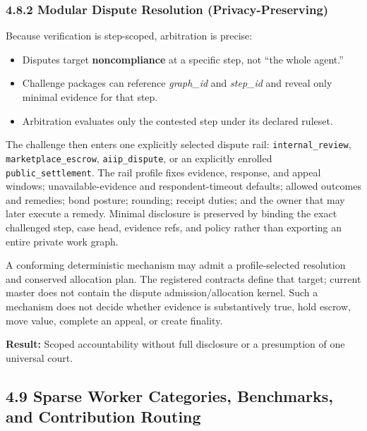 \documentclass[
  11pt,
]{article}
\providecommand{\tightlist}{%
  \setlength{\itemsep}{0pt}\setlength{\parskip}{0pt}}
\begin{document}
\hypertarget{modular-dispute-resolution-privacy-preserving}{%
\subsubsection{4.8.2 Modular Dispute Resolution
(Privacy-Preserving)}\label{modular-dispute-resolution-privacy-preserving}}

Because verification is step-scoped, arbitration is precise:

\begin{itemize}
\tightlist
\item
  Disputes target \textbf{noncompliance} at a specific step, not ``the
  whole agent.''
\item
  Challenge packages can reference \emph{graph\_id} and \emph{step\_id}
  and reveal only minimal evidence for that step.
\item
  Arbitration evaluates only the contested step under its declared
  ruleset.
\end{itemize}

The challenge then enters one explicitly selected dispute rail:
\texttt{internal\_review}, \texttt{marketplace\_escrow},
\texttt{aiip\_dispute}, or an explicitly enrolled
\texttt{public\_settlement}. The rail profile fixes evidence, response, and
appeal windows; unavailable-evidence and respondent-timeout defaults; allowed
outcomes and remedies; bond posture; rounding; receipt duties; and the owner
that may later execute a remedy. Minimal disclosure is preserved by binding
the exact challenged step, case head, evidence refs, and policy rather than
exporting an entire private work graph.

A conforming deterministic mechanism may admit a profile-selected resolution
and conserved allocation plan. The registered contracts define that target;
current master does not contain the dispute admission/allocation kernel. Such a
mechanism does not decide whether evidence is substantively true, hold escrow,
move value, complete an appeal, or create finality.

\textbf{Result: }Scoped accountability without full disclosure or a
presumption of one universal court.

\hypertarget{sparse-worker-categories-benchmarks-and-contribution-routing}{%
\subsection{4.9 Sparse Worker Categories, Benchmarks, and Contribution
Routing}\label{sparse-worker-categories-benchmarks-and-contribution-routing}}
\end{document}
